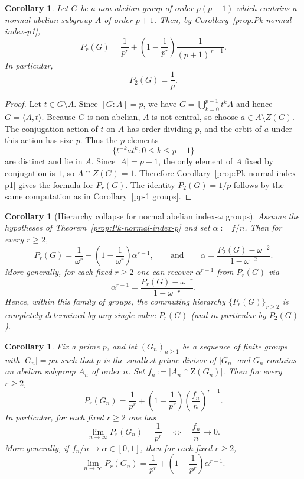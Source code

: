 \documentclass[11pt]{article}
\newtheorem{corollary}[theorem]{Corollary}
\theoremstyle{definition}
\theoremstyle{remark}
\theoremstyle{definition}
\theoremstyle{plain}
\newcommand{\Z}{\mathrm{Z}}
\begin{document}
\begin{corollary}\label{pp+1 groups}
    Let $G$ be a non-abelian group of order $p(p+1)$ which contains a normal abelian subgroup $A$ of order $p+1$.
    Then, by Corollary~\ref{prop:Pk-normal-index-p1},
    \[
P_r(G)=\frac{1}{p^r}+\left(1-\frac{1}{p^r}\right)\frac{1}{(p+1)^{\,r-1}}.
\]
In particular,
\[
P_2(G)=\frac{1}{p}.
   \]
\end{corollary}

\begin{proof}
 Let $t\in G\setminus A$.
 Since $[G:A]=p$, we have $G=\bigcup_{k=0}^{p-1} t^kA$ and hence $G=\langle A,t\rangle$.
 Because $G$ is non-abelian, $A$ is not central, so choose $a\in A\setminus Z(G)$.
 The conjugation action of $t$ on $A$ has order dividing $p$, and the orbit of $a$ under this action has size $p$.
 Thus the $p$ elements
 \[
 \{t^{-k}at^k : 0\le k\le p-1\}
\]
 are distinct and lie in $A$.
 Since $|A|=p+1$, the only element of $A$ fixed by conjugation is $1$, so $A\cap Z(G)=1$.
 Therefore Corollary~\ref{prop:Pk-normal-index-p1} gives the formula for $P_r(G)$.
 The identity $P_2(G)=1/p$ follows by the same computation as in Corollary~\ref{pp-1 groups}.
\end{proof}

\begin{corollary}[Hierarchy collapse for normal abelian index-$\omega$ groups]\label{cor:hierarchy-collapse}
Assume the hypotheses of Theorem~\ref{prop:Pk-normal-index-p} and set $\alpha:=f/n$.
Then for every $r\ge 2$,
\[
P_r(G)=\frac{1}{\omega^r}+\left(1-\frac{1}{\omega^r}\right)\alpha^{r-1},
\qquad\text{and}\qquad
\alpha=\frac{P_2(G)-\omega^{-2}}{1-\omega^{-2}}.
\]
More generally, for each fixed $r\ge 2$ one can recover $\alpha^{r-1}$ from $P_r(G)$ via
\[
\alpha^{r-1}=\frac{P_r(G)-\omega^{-r}}{1-\omega^{-r}}.
\]
Hence, within this family of groups, the commuting hierarchy $\{P_r(G)\}_{r\ge 2}$ is completely determined by any single value $P_r(G)$ (and in particular by $P_2(G)$).
\end{corollary}

\begin{corollary}\label{cor:P3-index-p-limit}
Fix a prime $p$, and let $(G_n)_{n\ge 1}$ be a sequence of finite groups with $|G_n|=pn$ such that $p$ is the smallest prime divisor of $|G_n|$
and $G_n$ contains an abelian subgroup $A_n$ of order $n$.
Set $f_n:=|A_n\cap \Z(G_n)|$.
Then for every $r\ge 2$,
\[
P_r(G_n)=\frac{1}{p^r}+\left(1-\frac{1}{p^r}\right)\left(\frac{f_n}{n}\right)^{r-1}.
\]
In particular, for each fixed $r\ge 2$ one has
\[
\lim_{n\to\infty} P_r(G_n)=\frac{1}{p^r}
\quad\Longleftrightarrow\quad
\frac{f_n}{n}\longrightarrow 0.
\]
More generally, if $f_n/n\to \alpha\in[0,1]$, then for each fixed $r\ge 2$,
\[
\lim_{n\to\infty} P_r(G_n)
=\frac{1}{p^r}+\left(1-\frac{1}{p^r}\right)\alpha^{r-1}.
\]
\end{corollary}
\end{document}
